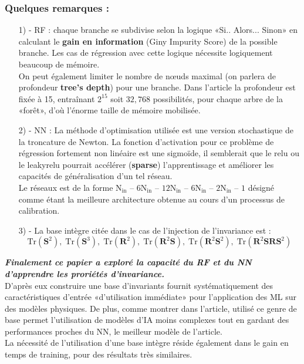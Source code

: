 \documentclass[a4paper,12pt]{report}
\newcommand{\bepar}[1]{
	\left( #1 \right)  
}
\newcommand\bk{\color{black}}
\newcommand\navy{\color{navy}}
\newcommand\red{\color{red}}
\numberwithin{equation}{section} %
\begin{document}
\noindent \subsubsection*{Quelques remarques :}
\begin{itemize}[leftmargin=10mm]
\item[1) - ] \navy RF \bk : chaque branche se subdivise selon la logique «Si.. Alors... Sinon» en calculant le \textbf{gain en information} (Giny Impurity Score) de la possible branche. Les cas de régression avec cette logique nécessite logiquement beaucoup de mémoire. \\ On peut également limiter le nombre de nœuds maximal (on parlera de profondeur \textbf{tree's depth}) pour une branche. Dans l'article la profondeur est fixée à 15, entraînant $2^{15}$ soit $32,768$ possibilités, pour chaque arbre de la «forêt», d'où l'énorme taille de mémoire mobilisée. \\
\item[2) - ] \red NN \bk : La méthode d'optimisation utilisée est une version stochastique de la troncature de Newton. La fonction d'activation pour ce problème de régression fortement non linéaire est une sigmoïde, il semblerait que le relu ou le leakyrelu pourrait accélérer (\textbf{sparse}) l'apprentissage et améliorer les capacités de généralisation d'un tel réseau.\\
 Le réseaux est de la forme $\text{N}_{\text{in}}$ -- $6 \text{N}_{\text{in}}$  -- $12 \text{N}_{\text{in}}$ -- $6 \text{N}_{\text{in}}$ -- $2 \text{N}_{\text{in}}$ -- $1$ désigné comme étant la meilleure architecture obtenue au cours d'un processus de calibration.
 
\item[3) -] La base intègre citée dans le cas de l'injection de l'invariance est : $$ \text{Tr} \bepar{\mathbf{S}^2},\; \text{Tr}\bepar{\mathbf{S}^3},\; \text{Tr}\bepar{\mathbf{R}^2},\; \text{Tr}\bepar{\mathbf{R}^2\mathbf{S}}, \; \text{Tr}\bepar{\mathbf{R}^2 \mathbf{S}^2}, \; \text{Tr}\bepar{\mathbf{R}^2 \mathbf{S} \mathbf{R} \mathbf{S}^2} $$ 
\end{itemize}

\vspace{0.5cm}

\textbf{\textit{Finalement ce papier a exploré la capacité du \navy RF \bk et du \red NN \bk d'apprendre les proriétés d'invariance.}}\\ D'après eux construire une base d'invariants fournit systématiquement des caractéristiques d'entrée «d'utilisation immédiate» pour l'application des ML sur des modèles physiques. De plus, comme montrer dans l'article, utilisé ce genre de base permet l'utilisation de modèles d'IA moins complexes tout en gardant des performances proches du NN, le meilleur modèle de l'article.\\
La nécessité de l'utilisation d'une base intègre réside également dans le gain en temps de training, pour des résultats très similaires.
\end{document}
